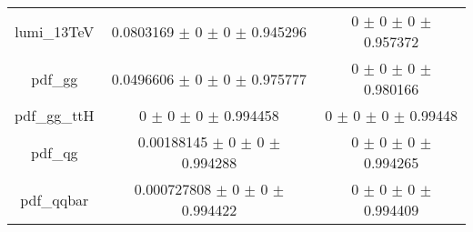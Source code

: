 \begin{table}
\begin{tabular}{ccc}
lumi\_13TeV & \num{0.0803169} $\pm$ \num{0} $\pm$ \num{0} $\pm$ \num{0.945296} & \num{0} $\pm$ \num{0} $\pm$ \num{0} $\pm$ \num{0.957372}\\
pdf\_gg & \num{0.0496606} $\pm$ \num{0} $\pm$ \num{0} $\pm$ \num{0.975777} & \num{0} $\pm$ \num{0} $\pm$ \num{0} $\pm$ \num{0.980166}\\
pdf\_gg\_ttH & \num{0} $\pm$ \num{0} $\pm$ \num{0} $\pm$ \num{0.994458} & \num{0} $\pm$ \num{0} $\pm$ \num{0} $\pm$ \num{0.99448}\\
pdf\_qg & \num{0.00188145} $\pm$ \num{0} $\pm$ \num{0} $\pm$ \num{0.994288} & \num{0} $\pm$ \num{0} $\pm$ \num{0} $\pm$ \num{0.994265}\\
pdf\_qqbar & \num{0.000727808} $\pm$ \num{0} $\pm$ \num{0} $\pm$ \num{0.994422} & \num{0} $\pm$ \num{0} $\pm$ \num{0} $\pm$ \num{0.994409}\\
\bottomrule
\end{tabular}
\end{table}